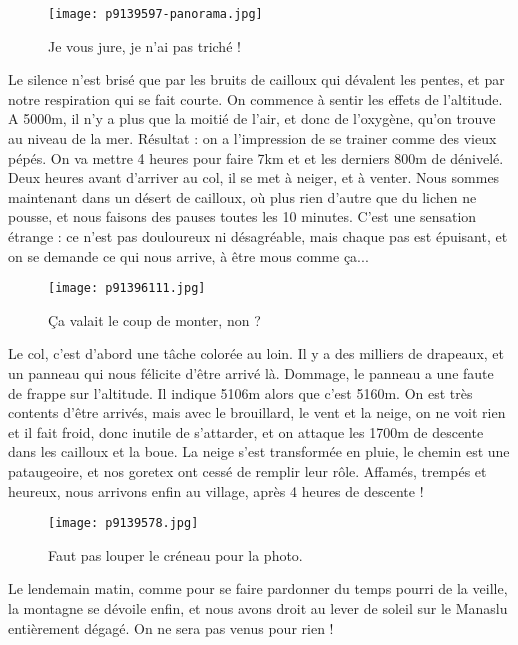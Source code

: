 \documentclass{book}
\begin{document}
\begin{figure}[h]
\centering
\texttt{[image: p9139597-panorama.jpg]}
\caption*{Je vous jure, je n'ai pas triché !}
\end{figure}

Le silence n'est brisé que par les bruits de cailloux qui dévalent les pentes, et par notre respiration qui se fait courte. On commence à sentir les effets de l'altitude. A 5000m, il n'y a plus que la moitié de l'air, et donc de l'oxygène, qu'on trouve au niveau de la mer. Résultat : on a l'impression de se trainer comme des vieux pépés. On va mettre 4 heures pour faire 7km et et les derniers 800m de dénivelé. Deux heures avant d'arriver au col, il se met à neiger, et à venter. Nous sommes maintenant dans un désert de cailloux, où plus rien d'autre que du lichen ne pousse, et nous faisons des pauses toutes les 10 minutes. C'est une sensation étrange : ce n'est pas douloureux ni désagréable, mais chaque pas est épuisant, et on se demande ce qui nous arrive, à être mous comme ça...


\begin{figure}[h]
\centering
\texttt{[image: p91396111.jpg]}
\caption*{Ça valait le coup de monter, non ?}
\end{figure}

Le col, c'est d'abord une tâche colorée au loin. Il y a des milliers de drapeaux, et un panneau qui nous félicite d'être arrivé là. Dommage, le panneau a une faute de frappe sur l'altitude. Il indique 5106m alors que c'est 5160m. On est très contents d'être arrivés, mais avec le brouillard, le vent et la neige, on ne voit rien et il fait froid, donc inutile de s'attarder, et on attaque les 1700m de descente dans les cailloux et la boue. La neige s'est transformée en pluie, le chemin est une pataugeoire, et nos goretex ont cessé de remplir leur rôle. Affamés, trempés et heureux, nous arrivons enfin au village, après 4 heures de descente !


\begin{figure}[h]
\centering
\texttt{[image: p9139578.jpg]}
\caption*{Faut pas louper le créneau pour la photo.}
\end{figure}

Le lendemain matin, comme pour se faire pardonner du temps pourri de la veille, la montagne se dévoile enfin, et nous avons droit au lever de soleil sur le Manaslu entièrement dégagé. On ne sera pas venus pour rien !
\end{document}
